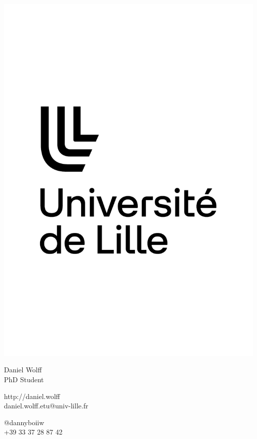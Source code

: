 \documentclass{article}
\begin{document}
\centering \includegraphics[width=.25\linewidth]{logo}\\[5pt]
\parbox{2in}{\Large \centering Daniel Wolff\\[1pt]
\normalsize PhD Student}

\vfill
\raggedright
\begin{multicols}{2}
http://daniel.wolff\\
daniel.wolff.etu@univ-lille.fr

\columnbreak
\raggedleft
@dannyboiiw\\
+39 33 37 28 87 42\end{multicols}%
\end{document}

